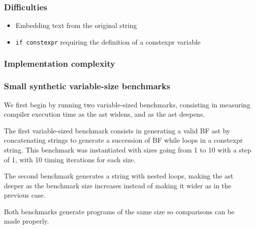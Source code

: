 \documentclass[../main]{subfiles}
\begin{document}
\subsubsection{
  Difficulties
}

\begin{itemize}
\item Embedding text from the original string
\item \lstinline{if constexpr} requiring the definition of a \gls{constexpr} variable
\end{itemize}

\subsubsection{
  Implementation complexity
}

\subsubsection{
  Small synthetic variable-size benchmarks
}

We first begin by running two variable-sized benchmarks, consisting in
measuring compiler execution time as the \gls{ast} widens, and as the \gls{ast} deepens.

The first variable-sized benchmark consists in generating a valid BF \gls{ast} by
concatenating strings to generate a succession of BF while loops in a
\gls{constexpr} string. This benchmark was instantiated with sizes going from 1 to
10 with a step of 1, with 10 timing iterations for each size.

The second benchmark generates a string with
nested loops, making the \gls{ast} deeper as the benchmark size increases instead
of making it wider as in the previous case.

Both benchmarks generate programs of the same size so comparisons can be made
properly.
\end{document}
